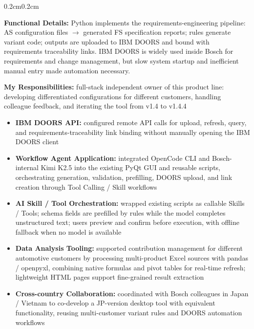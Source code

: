 \documentclass[10pt, a4paper]{article}
\newenvironment{highlights}{
    \begin{itemize}[
        topsep=0.10cm, parsep=0.10cm,
        partopsep=0pt, itemsep=0pt,
        leftmargin=0.4cm + 10pt
    ]
}{
    \end{itemize}
}
\newenvironment{onecolentry}{
    \begin{adjustwidth}{0.2cm}{0.2cm}
}{
    \end{adjustwidth}
}
\begin{document}

    \begin{onecolentry}
        \textbf{Functional Details:} Python implements the requirements-engineering pipeline: AS configuration files $\to$ generated FS specification reports; rules generate variant code; outputs are uploaded to IBM DOORS and bound with requirements traceability links. IBM DOORS is widely used inside Bosch for requirements and change management, but slow system startup and inefficient manual entry made automation necessary.\par
        \textbf{My Responsibilities:} full-stack independent owner of this product line: developing differentiated configurations for different customers, handling colleague feedback, and iterating the tool from v1.4 to v1.4.4
        \begin{highlights}
            \item \textbf{IBM DOORS API:} configured remote API calls for upload, refresh, query, and requirements-traceability link binding without manually opening the IBM DOORS client
            \item \textbf{Workflow Agent Application:} integrated OpenCode CLI and Bosch-internal Kimi K2.5 into the existing PyQt GUI and reusable scripts, orchestrating generation, validation, prefilling, DOORS upload, and link creation through Tool Calling / Skill workflows
            \item \textbf{AI Skill / Tool Orchestration:} wrapped existing scripts as callable Skills / Tools; schema fields are prefilled by rules while the model completes unstructured text; users preview and confirm before execution, with offline fallback when no model is available
            \item \textbf{Data Analysis Tooling:} supported contribution management for different automotive customers by processing multi-product Excel sources with pandas / openpyxl, combining native formulas and pivot tables for real-time refresh; lightweight HTML pages support fine-grained result extraction
            \item \textbf{Cross-country Collaboration:} coordinated with Bosch colleagues in Japan / Vietnam to co-develop a JP-version desktop tool with equivalent functionality, reusing multi-customer variant rules and DOORS automation workflows
        \end{highlights}
    \end{onecolentry}
\end{document}
